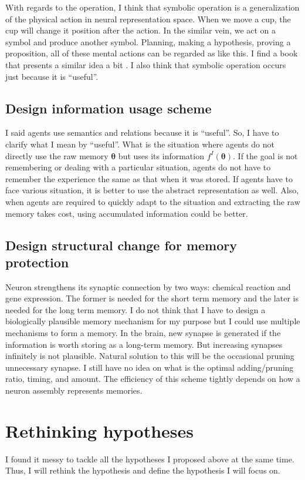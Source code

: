 \documentclass[12pt]{article}
\begin{document}
With regards to the operation, I think that symbolic operation is a generalization 
of the physical action in neural representation space. When we move a cup, the cup will change 
it position after the action. In the similar vein, we act on a symbol and produce another symbol. 
Planning, making a hypothesis, proving a proposition, all of these mental actions can be 
regarded as like this. I find a book that presents a similar idea a bit \cite{Hawkins21}. 
I also think that symbolic operation occurs just because it is ``useful''.

\subsection{Design information usage scheme}
I said agents use semantics and relations because it is ``useful''. So, I have to clarify what 
I mean by ``useful''. What is the situation where agents do not directly use the raw memory $\bm{\theta}$ but 
uses its information $f^I(\bm{\theta})$. If the goal is not remembering or dealing with a particular situation, 
agents do not have to remember the experience the same as that when it was stored. If agents have to face various 
situation, it is better to use the abstract representation as well. Also, 
when agents are required to quickly adapt to the situation and extracting the raw memory 
takes cost, using accumulated information could be better.

\subsection{Design structural change for memory protection}
Neuron strengthens its synaptic connection by two ways: chemical reaction and gene expression. 
The former is needed for the short term memory and the later is needed for the long term memory. 
I do not think that I have to design a biologically plausible memory mechanism for my purpose
but I could use multiple mechanisms to form a memory. 
In the brain, new synapse is generated if the information is worth storing as a long-term memory. 
But increasing synapses infinitely is not plausible. Natural solution to this will be 
the occasional pruning unnecessary synapse. I still have no idea on what is the optimal 
adding/pruning ratio, timing, and amount. The efficiency of this scheme tightly depends on how 
a neuron assembly represents memories. 

\section{Rethinking hypotheses}
I found it messy to tackle all the hypotheses I proposed above at the same time. Thus, I will 
rethink the hypothesis and define the hypothesis I will focus on.



\end{document}
